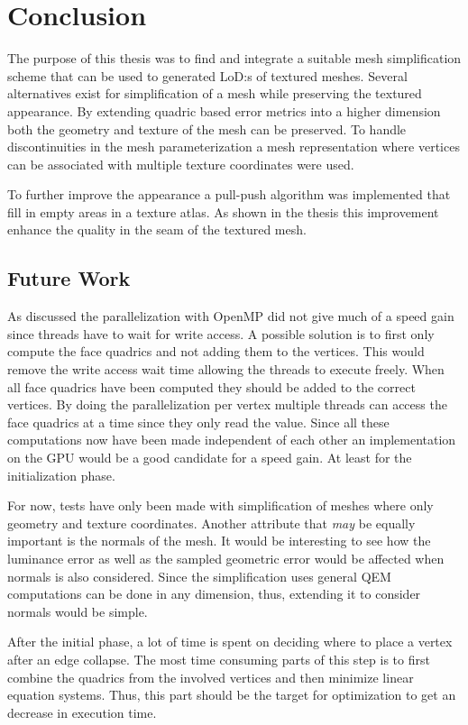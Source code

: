 \chapter{Conclusion} \label{cha:conclusion}

The purpose of this thesis was to find and integrate a suitable mesh simplification scheme that can be used to generated LoD:s of textured meshes. Several alternatives exist for simplification of a mesh while preserving the textured appearance. By extending quadric based error metrics into a higher dimension both the geometry and texture of the mesh can be preserved. To handle discontinuities in the mesh parameterization a mesh representation where vertices can be associated with multiple texture coordinates were used.

To further improve the appearance a pull-push algorithm was implemented that fill in empty areas in a texture atlas. As shown in the thesis this improvement enhance the quality in the seam of the textured mesh.

\section{Future Work}
As discussed the parallelization with OpenMP did not give much of a speed gain since threads have to wait for write access. A possible solution is to first only compute the face quadrics and not adding them to the vertices. This would remove the write access wait time allowing the threads to execute freely. When all face quadrics have been computed they should be added to the correct vertices. By doing the parallelization per vertex multiple threads can access the face quadrics at a time since they only read the value. Since all these computations now have been made independent of each other an implementation on the GPU would be a good candidate for a speed gain. At least for the initialization phase.

For now, tests have only been made with simplification of meshes where only geometry and texture coordinates. Another attribute that \emph{may} be equally important is the normals of the mesh. It would be interesting to see how the luminance error as well as the sampled geometric error would be affected when normals is also considered. Since the simplification uses general QEM computations can be done in any dimension, thus, extending it to consider normals would be simple.

After the initial phase, a lot of time is spent on deciding where to place a vertex after an edge collapse. The most time consuming parts of this step is to first combine the quadrics from the involved vertices and then minimize linear equation systems. Thus, this part should be the target for optimization to get an decrease in execution time. 
